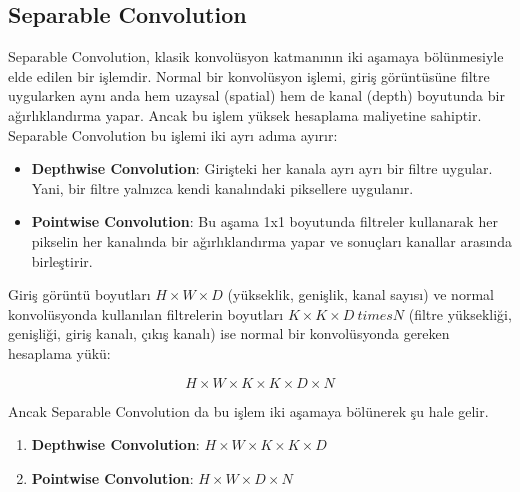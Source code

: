 \newpage

\subsection{Separable Convolution}

Separable Convolution, klasik konvolüsyon katmanının iki aşamaya bölünmesiyle elde edilen bir işlemdir. Normal bir konvolüsyon işlemi, giriş görüntüsüne filtre uygularken aynı anda hem uzaysal (spatial) hem de kanal (depth) boyutunda bir ağırlıklandırma yapar. Ancak bu işlem yüksek hesaplama maliyetine sahiptir. Separable Convolution bu işlemi iki ayrı adıma ayırır:

\begin{itemize}
    \item \textbf{Depthwise Convolution}: Girişteki her kanala ayrı ayrı bir filtre uygular. Yani, bir filtre yalnızca kendi kanalındaki piksellere uygulanır.
    \item \textbf{Pointwise Convolution}: Bu aşama 1x1 boyutunda filtreler kullanarak her pikselin her kanalında bir ağırlıklandırma yapar ve sonuçları kanallar arasında birleştirir.
\end{itemize}

Giriş görüntü boyutları $H \times W \times D$ (yükseklik, genişlik, kanal sayısı) ve normal konvolüsyonda kullanılan filtrelerin boyutları $K \times K \times D \ times N$ (filtre yüksekliği, genişliği, giriş kanalı, çıkış kanalı) ise normal bir konvolüsyonda gereken hesaplama yükü:

\[ H \times W \times K \times K \times D \times N \]

Ancak Separable Convolution da bu işlem iki aşamaya bölünerek şu hale gelir.

\begin{enumerate}
    \item \textbf{Depthwise Convolution}: $H \times W \times K \times K \times D$
    \item \textbf{Pointwise Convolution}: $H \times W \times D \times N$
\end{enumerate}

\newpage